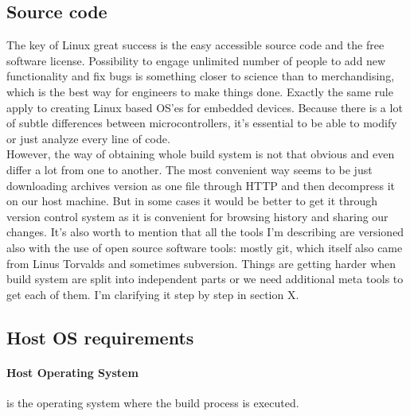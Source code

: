\documentclass[printmode]{mgr}
\begin{document}


\subsection{Source code}

The key of Linux great success is the easy accessible source code and the free software license. Possibility to engage unlimited number of people to add new functionality and fix bugs is something closer to science than to merchandising, which is the best way for engineers to make things done. Exactly the same rule apply to creating Linux based OS'es for embedded devices. Because there is a lot of subtle differences between microcontrollers, it's essential to be able to modify or just analyze every line of code. \\

However, the way of obtaining whole build system is not that obvious and even differ a lot from one to another. The most convenient way seems to be just downloading archives version as one file through HTTP and then decompress it on our host machine. But in some cases it would be better to get it through version control system as it is convenient for browsing history and sharing our changes. It's also worth to mention that all the tools I'm describing are versioned also with the use of open source software tools: mostly git, which itself also came from Linus Torvalds and sometimes subversion. Things are getting harder when build system are split into independent parts or we need additional meta tools to get each of them. I'm clarifying it step by step in section X. %



\subsection{Host OS requirements}

\paragraph{Host Operating System} is the operating system where the build process is executed.
\end{document}

